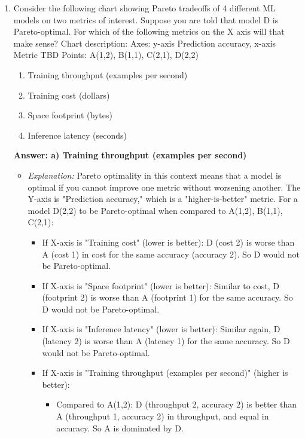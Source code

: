 \documentclass{article}
\begin{document}
\begin{enumerate}[label=\textbf{Question \arabic*.}]

\item Consider the following chart showing Pareto tradeoffs of 4 different ML models on two metrics of interest. Suppose you are told that model D is Pareto-optimal. For which of the following metrics on the X axis will that make sense?
    \newline Chart description:
    \newline Axes: y-axis Prediction accuracy, x-axis Metric TBD
    \newline Points: A(1,2), B(1,1), C(2,1), D(2,2)
    \begin{enumerate}[label=\alph*)]
        \item Training throughput (examples per second)
        \item Training cost (dollars)
        \item Space footprint (bytes)
        \item Inference latency (seconds)
    \end{enumerate}
    \textbf{Answer: a) Training throughput (examples per second)}
    \begin{itemize}
        \item \textit{Explanation:} Pareto optimality in this context means that a model is optimal if you cannot improve one metric without worsening another. The Y-axis is "Prediction accuracy," which is a "higher-is-better" metric.
        For a model D(2,2) to be Pareto-optimal when compared to A(1,2), B(1,1), C(2,1):
        \begin{itemize}
            \item If X-axis is "Training cost" (lower is better): D (cost 2) is worse than A (cost 1) in cost for the same accuracy (accuracy 2). So D would not be Pareto-optimal.
            \item If X-axis is "Space footprint" (lower is better): Similar to cost, D (footprint 2) is worse than A (footprint 1) for the same accuracy. So D would not be Pareto-optimal.
            \item If X-axis is "Inference latency" (lower is better): Similar again, D (latency 2) is worse than A (latency 1) for the same accuracy. So D would not be Pareto-optimal.
            \item If X-axis is "Training throughput (examples per second)" (higher is better):
                \begin{itemize}
                    \item Compared to A(1,2): D (throughput 2, accuracy 2) is better than A (throughput 1, accuracy 2) in throughput, and equal in accuracy. So A is dominated by D.

\end{itemize}
\end{itemize}
\end{itemize}
\end{enumerate}
\end{document}
